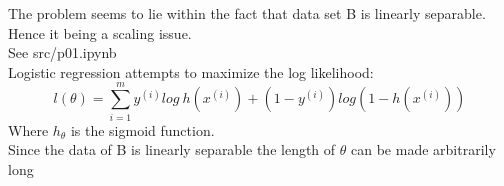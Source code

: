 \begin{answer}
    The problem seems to lie within the fact that data set B is linearly separable. Hence it being a scaling issue.\\
    See src/p01.ipynb\\
    Logistic regression attempts to maximize the log likelihood:
    $$
    l(\theta) = \sum_{i=1}^m y^{(i)}log\ h(x^{(i)}) + (1-y^{(i)})log(1-h(x^{(i)}))
    $$
    Where $h_{\theta}$ is the sigmoid function.\\
    Since the data of B is linearly separable the length of $\theta$ can be made arbitrarily long\\
\end{answer}
